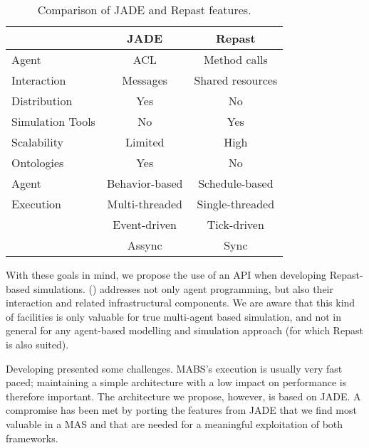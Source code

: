 \begin{table}[h]
	\normalsize
	\caption{Comparison of JADE and Repast features.}
	\label{tab:jadevsrep}
	\begin{center}
		\begin{tabular}{l|cc}
		\hline

		\hline
		\textbf{} & \textbf{JADE} & \textbf{Repast} \\ %
		\hline
			Agent 		& ACL  	&  Method calls  \\ %
			Interaction	& Messages	&  Shared resources \\
		\hline
			Distribution & Yes & No \\ %
		\hline
			Simulation Tools & No & Yes \\ %
		\hline
			Scalability & Limited & High \\ %
		\hline
			Ontologies & Yes & No \\ %
		\hline
			Agent  		& Behavior-based & Schedule-based  \\ %
			Execution	& Multi-threaded & Single-threaded \\ %
						& Event-driven   & Tick-driven 	   \\ %
						& Assync		 & Sync 		   \\ %
		\hline
		\end{tabular}
	\end{center}
\end{table} 

With these goals in mind, we propose the use of an API when developing Repast-based simulations. \apiname{} (\apilongname{}) addresses not only agent programming, but also their interaction and related infrastructural components.
We are aware that this kind of facilities is only valuable for true multi-agent based simulation, and not in general for any agent-based modelling and simulation approach (for which Repast is also suited).

Developing \apiname{} presented some challenges.
MABS's execution is usually very fast paced; maintaining a simple architecture with a low impact on performance is therefore important.
The architecture we propose, however, is based on \gls{JADE}.
A compromise has been met by porting the features from \gls{JADE} that we find most valuable in a \gls{MAS} and that are needed for a meaningful exploitation of both frameworks.

